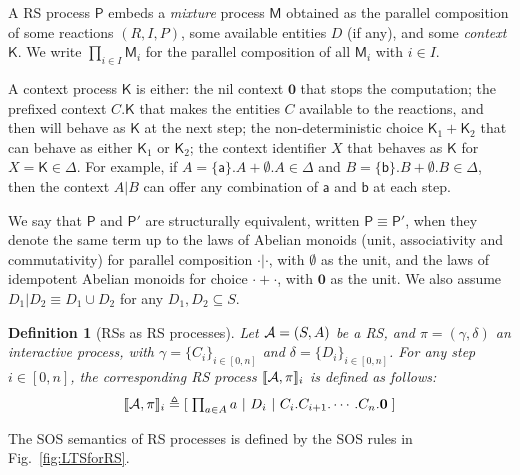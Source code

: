 \documentclass[sn-mathphys-num,a4paper,iicol,lineno,pdflatex]{sn-jnl-hacked}
\newcommand{\nil}{\mathbf{0}}
\theoremstyle{thmstyleone}%
\theoremstyle{thmstyletwo}%
\theoremstyle{thmstylethree}%
\newtheorem{definition}{Definition}%
\begin{document}
A RS process  $\mathsf{P}$ embeds a \emph{mixture} process $\mathsf{M}$ obtained as the parallel composition of some reactions $(R,I,P)$, some available entities $D$ (if any), and some \emph{context} $\mathsf{K}$.
We write $\prod_{i\in I} \mathsf{M}_i$ for the parallel composition of all $\mathsf{M}_i$ with $i\in I$. 

A  context process $\mathsf{K}$ is either: 
the nil context $\nil$ that stops the computation;
the prefixed context $C.\mathsf{K}$ that makes the entities $C$ available to the reactions, and then will behave as $\mathsf{K}$ at the next step;
the non-deterministic choice $\mathsf{K}_1+\mathsf{K}_2$ that can behave as either  $\mathsf{K}_1$ or $\mathsf{K}_2$;  
the context identifier $X$ that behaves as $\mathsf{K}$ for $X=\mathsf{K}\in \Delta$.
For example, if $A=\{\mathsf{a}\}.A + \emptyset.A\in \Delta$ and $B=\{\mathsf{b}\}.B + \emptyset.B\in \Delta$, then the context $A | B$ can  offer any combination of $\mathsf{a}$ and $\mathsf{b}$ at each step.


We say that $\mathsf{P}$ and $\mathsf{P}'$ are structurally equivalent, written $\mathsf{P} \equiv \mathsf{P}'$, when they denote the same term up to the laws of Abelian monoids (unit, associativity and commutativity) for  parallel composition $\cdot | \cdot$, with $\emptyset$ as the unit, and the laws of idempotent Abelian monoids for choice $\cdot +\cdot$, with $\nil$ as the unit. We also assume $D_1 | D_2 \equiv D_1\cup D_2$ for any $D_1,D_2\subseteq S$.

\begin{definition}[RSs as RS processes]\label{def:fromRS}
Let ${\cal A} = (S, A)$  be  a RS, and $\pi = (\gamma, \delta)$ an interactive process, with $\gamma = \{C_i\}_{i\in[0,n]}$ and $\delta = \{D_i\}_{i\in[0,n]}$.
%
For any step $i\in[0,n]$, the corresponding RS process $\llbracket {\cal A},\pi \rrbracket_i$ is defined as follows:
$$
\llbracket {\cal A},\pi \rrbracket_i
\triangleq 
[\; \textstyle \prod_{a\in A} a~|~D_i~|~C_i.C_{i+1}.\cdots.C_n.\nil\;]
$$
%
\end{definition}


The SOS semantics of  RS processes is defined by the SOS rules in Fig.~\ref{fig:LTSforRS}.
\end{document}
